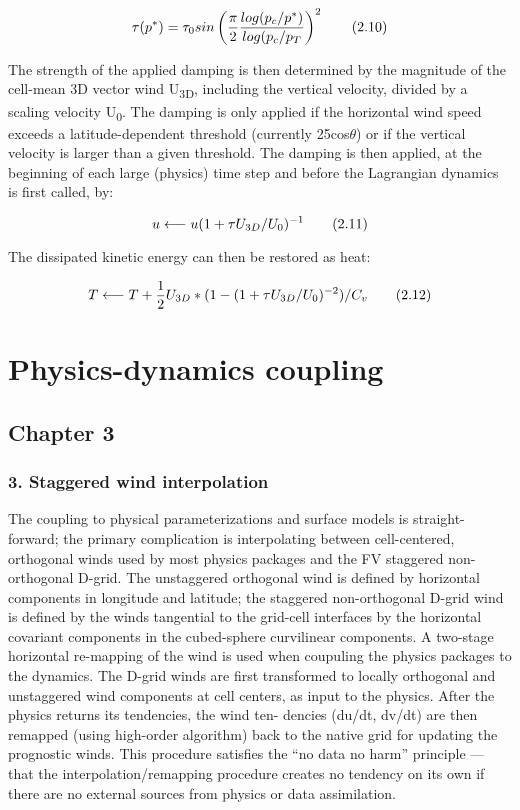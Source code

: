 \[ \tau(p^*) = \tau_0 sin \left( \frac{\pi}{2} \frac{log(p_c / p^*)}{log(p_c / p_T} \right)^2 \\ \tag {2.10} \]

The strength of the applied damping is then determined by the magnitude of the cell-\/mean 3D vector wind U\textsubscript{3D}, including the vertical velocity, divided by a scaling velocity U\textsubscript{0}. The damping is only applied if the horizontal wind speed exceeds a latitude-\/dependent threshold (currently 25cos{$\theta$}) or if the vertical velocity is larger than a given threshold. The damping is then applied, at the beginning of each large (physics) time step and before the Lagrangian dynamics is first called, by\+:

\[ u \longleftarrow u(1 + \tau U_{3D} / U_0)^{-1} \\ \tag {2.11} \]

The dissipated kinetic energy can then be restored as heat\+:

\[ T \longleftarrow T + \frac{1}{2} U_{3D} * (1 - (1 + \tau U_{3D} / U_0)^{-2}) / C_v \\ \tag {2.12} \] \hypertarget{physics}{}\section{Physics-\/dynamics coupling}\label{physics}
\subsection*{Chapter 3}

\subsubsection*{3. Staggered wind interpolation}

The coupling to physical parameterizations and surface models is straight-\/ forward; the primary complication is interpolating between cell-\/centered, orthogonal winds used by most physics packages and the FV\textthreesuperior{} staggered non-\/ orthogonal D-\/grid. The unstaggered orthogonal wind is defined by horizontal components in longitude and latitude; the staggered non-\/orthogonal D-\/grid wind is defined by the winds tangential to the grid-\/cell interfaces by the horizontal covariant components in the cubed-\/sphere curvilinear components. A two-\/stage horizontal re-\/mapping of the wind is used when coupuling the physics packages to the dynamics. The D-\/grid winds are first transformed to locally orthogonal and unstaggered wind components at cell centers, as input to the physics. After the physics returns its tendencies, the wind ten-\/ dencies (du/dt, dv/dt) are then remapped (using high-\/order algorithm) back to the native grid for updating the prognostic winds. This procedure satisfies the “no data no harm” principle — that the interpolation/remapping procedure creates no tendency on its own if there are no external sources from physics or data assimilation.

